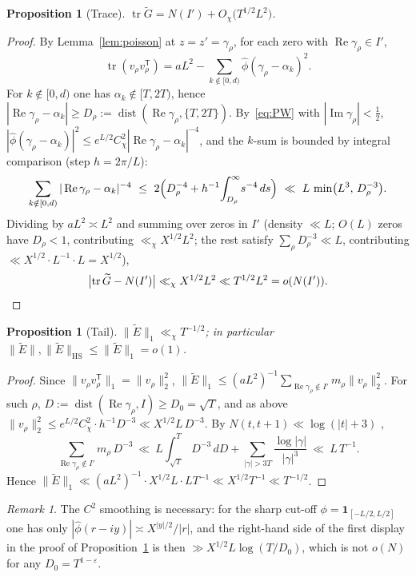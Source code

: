 \documentclass[11pt]{amsart}
\newtheorem{proposition}[theorem]{Proposition}
\theoremstyle{definition}
\theoremstyle{remark}
\newtheorem{remark}[theorem]{Remark}
\numberwithin{equation}{section}
\DeclareMathOperator{\tr}{tr}
\DeclareMathOperator{\dist}{dist}
\DeclareMathOperator{\re}{Re}
\DeclareMathOperator{\im}{Im}
\newcommand{\eps}{\varepsilon}
\newcommand{\wh}{\widehat}
\newcommand{\Gt}{\widetilde{G}}
\newcommand{\Et}{\widetilde{E}}
\newcommand{\one}{\mathbf 1}
\newcommand{\dd}{\,d}
\newcommand{\HS}{\mathrm{HS}}
\begin{document}
\begin{proposition}[Trace]\label{prop:trace}
$\tr\Gt=N(I')+O_\chi\bigl(T^{1/2}L^2\bigr)$.
\end{proposition}
\begin{proof}
By Lemma~\ref{lem:poisson} at $z=z'=\gamma_\rho$, for each zero with $\re\gamma_\rho\in I'$,
\[
\tr(v_\rho v_\rho^{\mathsf T})=aL^2-\sum_{k\notin[0,d)}\wh\phi(\gamma_\rho-\alpha_k)^2.
\]
For $k\notin[0,d)$ one has $\alpha_k\notin[T,2T)$, hence $|\re\gamma_\rho-\alpha_k|\ge D_\rho:=\dist(\re\gamma_\rho,\{T,2T\})$. By~\eqref{eq:PW} with $|\im\gamma_\rho|<\tfrac12$, $|\wh\phi(\gamma_\rho-\alpha_k)|^2\le e^{L/2}C_\chi^2|\re\gamma_\rho-\alpha_k|^{-4}$, and the $k$-sum is bounded by integral comparison (step $h=2\pi/L$):
\[
\sum_{k\notin[0,d)}|\re\gamma_\rho-\alpha_k|^{-4}\ \le\ 2\Bigl(D_\rho^{-4}+h^{-1}\!\int_{D_\rho}^\infty\!s^{-4}\dd s\Bigr)\ \ll\ L\,\min\bigl(L^3,\,D_\rho^{-3}\bigr).
\]
Dividing by $aL^2\asymp L^2$ and summing over zeros in $I'$ (density $\ll L$; $O(L)$ zeros have $D_\rho<1$, contributing $\ll_\chi X^{1/2}L^2$; the rest satisfy $\sum_\rho D_\rho^{-3}\ll L$, contributing $\ll X^{1/2}\cdot L^{-1}\cdot L=X^{1/2}$),
\[
\bigl|\tr\Gt-N(I')\bigr|\ll_\chi X^{1/2}L^2\ll T^{1/2}L^2=o(N(I')).\qedhere
\]
\end{proof}

\begin{proposition}[Tail]\label{prop:tail}
$\|\Et\|_1\ll_\chi T^{-1/2}$; in particular $\|\Et\|,\|\Et\|_{\HS}\le\|\Et\|_1=o(1)$.
\end{proposition}
\begin{proof}
Since $\|v_\rho v_\rho^{\mathsf T}\|_1=\|v_\rho\|_2^2$, $\|\Et\|_1\le(aL^2)^{-1}\sum_{\re\gamma_\rho\notin I'}m_\rho\|v_\rho\|_2^2$. For such $\rho$, $D:=\dist(\re\gamma_\rho,I)\ge D_0=\sqrt T$, and as above $\|v_\rho\|_2^2\le e^{L/2}C_\chi^2\cdot h^{-1}D^{-3}\ll X^{1/2}L\,D^{-3}$. By $N(t,t+1)\ll\log(|t|+3)$ \cite[Thm~9.2]{Tit86},
\[
\sum_{\re\gamma_\rho\notin I'}m_\rho\,D^{-3}\ \ll\ L\!\int_{\sqrt T}^{T}\!D^{-3}\dd D+\sum_{|\gamma|>3T}\frac{\log|\gamma|}{|\gamma|^{3}}\ \ll\ L\,T^{-1}.
\]
Hence $\|\Et\|_1\ll(aL^2)^{-1}\cdot X^{1/2}L\cdot LT^{-1}\ll X^{1/2}T^{-1}\ll T^{-1/2}$.
\end{proof}

\begin{remark}\label{rem:taper}
The $C^2$ smoothing is necessary: for the sharp cut-off $\phi=\one_{[-L/2,L/2]}$ one has only $|\wh\phi(r-iy)|\asymp X^{|y|/2}/|r|$, and the right-hand side of the first display in the proof of Proposition~\ref{prop:tail} is then $\gg X^{1/2}L\log(T/D_0)$, which is not $o(N)$ for any $D_0=T^{1-\eps}$.
\end{remark}
\end{document}
